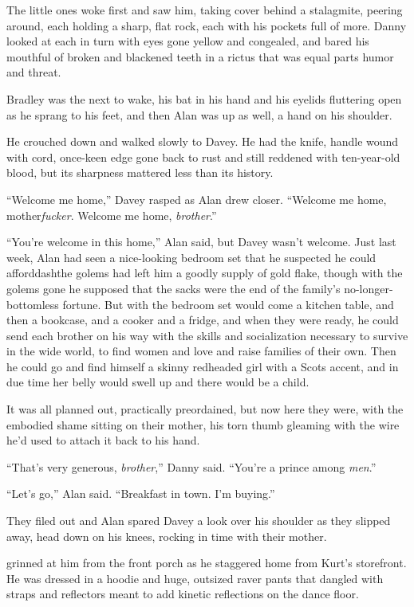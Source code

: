The little ones woke first and saw him, taking cover behind a
stalagmite, peering around, each holding a sharp, flat rock, each with
his pockets full of more.  Danny looked at each in turn with eyes gone
yellow and congealed, and bared his mouthful of broken and blackened
teeth in a rictus that was equal parts humor and threat.

Bradley was the next to wake, his bat in his hand and his eyelids
fluttering open as he sprang to his feet, and then Alan was up as
well, a hand on his shoulder.

He crouched down and walked slowly to Davey.  He had the knife, handle
wound with cord, once-keen edge gone back to rust and still reddened
with ten-year-old blood, but its sharpness mattered less than its
history.

``Welcome me home,'' Davey rasped as Alan drew closer.  ``Welcome me
home, mother\textit{fucker}.  Welcome me home, \textit{brother}.''

``You're welcome in this home,'' Alan said, but Davey wasn't welcome. 
Just last week, Alan had seen a nice-looking bedroom set that he
suspected he could afforddash{}the golems had left him a goodly supply of
gold flake, though with the golems gone he supposed that the sacks
were the end of the family's no-longer-bottomless fortune.  But with
the bedroom set would come a kitchen table, and then a bookcase, and a
cooker and a fridge, and when they were ready, he could send each
brother on his way with the skills and socialization necessary to
survive in the wide world, to find women and love and raise families
of their own.  Then he could go and find himself a skinny redheaded
girl with a Scots accent, and in due time her belly would swell up and
there would be a child.

It was all planned out, practically preordained, but now here they
were, with the embodied shame sitting on their mother, his torn thumb
gleaming with the wire he'd used to attach it back to his hand.

``That's very generous, \textit{brother},'' Danny said.  ``You're a
prince among \textit{men}.''

``Let's go,'' Alan said.  ``Breakfast in town.  I'm buying.''

They filed out and Alan spared Davey a look over his shoulder as they
slipped away, head down on his knees, rocking in time with their
mother.

 grinned at him from the front porch as he staggered home from
Kurt's storefront.  He was dressed in a hoodie and huge, outsized
raver pants that dangled with straps and reflectors meant to add
kinetic reflections on the dance floor.

